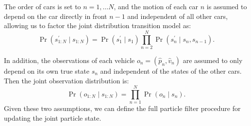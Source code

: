 The order of cars is set to $n=1, \dots N$, and the motion of each car $n$ is assumed to depend on the car directly in front $n-1$ and independent of all other cars, allowing us to factor the joint distribution transition model as:
\begin{equation}
    \Pr(s^{\prime}_{1:N} \mid s_{1:N}) = \Pr(s^{\prime}_{1}\mid s_1)\prod_{n=2}^N\Pr(s^{\prime}_{n}\mid s_n, s_{n-1}).
    \label{eq:transition}
\end{equation}

In addition, the observations of each vehicle $o_n = (\hat{p}_n, \hat{v}_n)$ are assumed to only depend on its own true state $s_n$ and independent of the states of the other cars. 
Then the joint observation distribution is:
\begin{equation}
    \Pr(o_{1:N} \mid s_{1:N}) = \prod_{n=1}^N \Pr (o_n \mid  s_n).
    \label{eq:joint_observation}
\end{equation}
Given these two assumptions, we can define the full particle filter procedure for updating the joint particle state.
